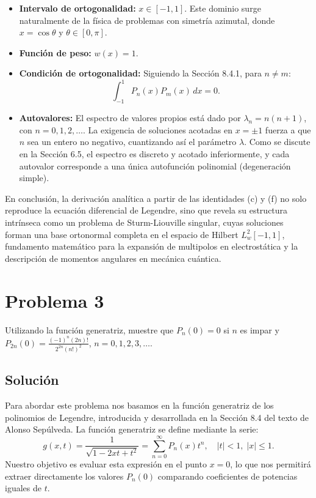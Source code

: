 \documentclass[a4paper]{article}
\begin{document}
\begin{itemize}
    \item \textbf{Intervalo de ortogonalidad:} $x \in [-1, 1]$. Este dominio surge naturalmente de la física de problemas con simetría azimutal, donde $x = \cos\theta$ y $\theta \in [0, \pi]$.
    \item \textbf{Función de peso:} $w(x) = 1$.
    \item \textbf{Condición de ortogonalidad:} Siguiendo la Sección 8.4.1, para $n \neq m$:
    $$
    \int_{-1}^{1} P_n(x) P_m(x) \, dx = 0.
    $$
    \item \textbf{Autovalores:} El espectro de valores propios está dado por $\lambda_n = n(n+1)$, con $n = 0, 1, 2, \dots$. La exigencia de soluciones acotadas en $x=\pm 1$ fuerza a que $n$ sea un entero no negativo, cuantizando así el parámetro $\lambda$. Como se discute en la Sección 6.5, el espectro es discreto y acotado inferiormente, y cada autovalor corresponde a una única autofunción polinomial (degeneración simple).
\end{itemize}
En conclusión, la derivación analítica a partir de las identidades (c) y (f) no solo reproduce la ecuación diferencial de Legendre, sino que revela su estructura intrínseca como un problema de Sturm-Liouville singular, cuyas soluciones forman una base ortonormal completa en el espacio de Hilbert $L^2_w[-1, 1]$, fundamento matemático para la expansión de multipolos en electrostática y la descripción de momentos angulares en mecánica cuántica.


\section{Problema 3}
Utilizando la función generatriz, muestre que $P_n(0)= 0$ si $n$ es impar y $P_{2n}(0)= \frac{(-1)^n(2n)!}{2^{2n}(n!)^2}$, $n= 0, 1, 2, 3, \dots$.

\subsection{Solución}
Para abordar este problema nos basamos en la función generatriz de los polinomios de Legendre, introducida y desarrollada en la Sección 8.4 del texto de Alonso Sepúlveda. La función generatriz se define mediante la serie:
$$
g(x,t) = \frac{1}{\sqrt{1 - 2xt + t^2}} = \sum_{n=0}^{\infty} P_n(x) t^n, \quad |t| < 1, \; |x| \leq 1.
$$
Nuestro objetivo es evaluar esta expresión en el punto $x=0$, lo que nos permitirá extraer directamente los valores $P_n(0)$ comparando coeficientes de potencias iguales de $t$.
\end{document}
